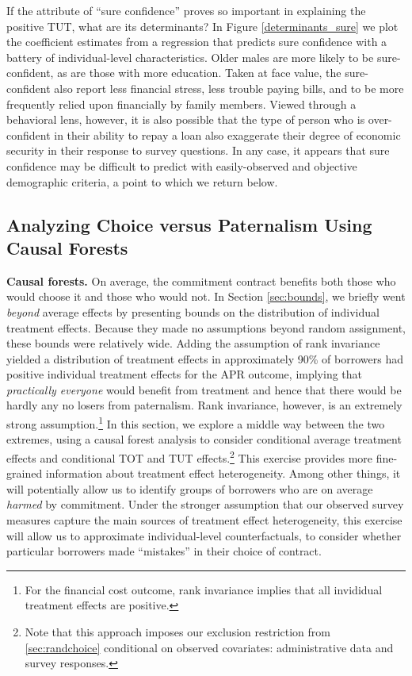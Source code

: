 \documentclass[11pt, a4paper]{article}
\begin{document}
If the attribute of ``sure confidence'' proves so important in explaining the positive TUT, what are its determinants? In Figure \ref{determinants_sure} we plot the coefficient estimates from a regression that predicts sure confidence with a battery of individual-level characteristics.  Older males are more likely to be sure-confident, as are those with more education.  Taken at face value, the sure-confident also report less financial stress, less trouble paying bills, and to be more frequently relied upon financially by family members.  Viewed through a behavioral lens, however, it is also possible that the type of person who is over-confident in their ability to repay a loan also %
exaggerate their degree of economic security in their response to survey questions. In any case, it appears that sure confidence may be difficult to predict with easily-observed and objective demographic criteria, a point to which we return below.


\subsection{Analyzing Choice versus Paternalism Using Causal Forests} \label{sec:RF}


\noindent \textbf{Causal forests.} 
On average, the commitment contract benefits both those who would choose it and those who would not.
In Section \ref{sec:bounds}, we briefly went \emph{beyond} average effects by presenting bounds on the distribution of individual treatment effects.
Because they made no assumptions beyond random assignment, these bounds were relatively wide.
Adding the assumption of rank invariance yielded a distribution of treatment effects in approximately 90\% of borrowers had positive individual treatment effects for the APR outcome, implying that \emph{practically everyone} would benefit from treatment and hence that there would be hardly any no losers from paternalism.
Rank invariance, however, is an extremely strong assumption.\footnote{For the financial cost outcome, rank invariance implies that all invididual treatment effects are positive.}
In this section, we explore a middle way between the two extremes, using a causal forest analysis to consider conditional average treatment effects and conditional TOT and TUT effects.\footnote{Note that this approach imposes our exclusion restriction from \ref{sec:randchoice} conditional on observed covariates: administrative data and survey responses.} 
This exercise provides more fine-grained information about treatment effect heterogeneity.
Among other things, it will potentially allow us to identify groups of borrowers who are on average \emph{harmed} by commitment.
Under the stronger assumption that our observed survey measures capture the main sources of treatment effect heterogeneity, this exercise will allow us to approximate individual-level counterfactuals, to consider whether particular borrowers made ``mistakes'' in their choice of contract. 
\end{document}
